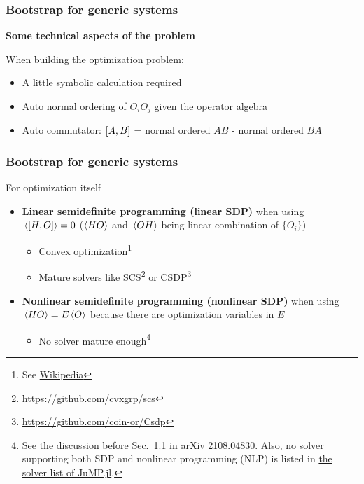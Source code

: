 \documentclass{beamer}
\newcommand{\concept}[1]{\textbf{#1}}
\begin{document}
\begin{frame}
\frametitle{Bootstrap for generic systems}

\textbf{Some technical aspects of the problem}

When building the optimization problem: 
\begin{itemize}
    \item A little symbolic calculation required
    \item Auto normal ordering of $O_i O_j$ given the operator algebra
    \item Auto commutator: $\comm{A}{B}$ = normal ordered $AB$ - normal ordered $BA$ 
\end{itemize}

\end{frame}

\begin{frame}
\frametitle{Bootstrap for generic systems}

For optimization itself
\begin{itemize}
    \item \concept{Linear semidefinite programming (linear SDP)} when using $\expval*{\comm{H}{O}} = 0$
    ($\expval{HO}$ and $\expval*{OH}$ being linear combination of $\{O_i\}$)
    \begin{itemize}
        \item Convex optimization\footnote{See \href{https://en.wikipedia.org/wiki/Semidefinite_programming}{Wikipedia}} 
        \item Mature solvers like SCS\footnote{\href{https://github.com/cvxgrp/scs}{https://github.com/cvxgrp/scs}} or CSDP\footnote{\href{https://github.com/coin-or/Csdp}{https://github.com/coin-or/Csdp}}
    \end{itemize}
    \item \concept{Nonlinear semidefinite programming (nonlinear SDP)} when using $\expval*{{H}{O}} = E \expval*{O}$
    because there are optimization variables in $E$
    \begin{itemize}
        \item No solver mature enough\footnote{See the discussion before Sec.~1.1 in \href{https://arxiv.org/abs/2108.04830}{arXiv 2108.04830}. Also, no solver supporting both SDP and nonlinear programming (NLP) is listed in \href{https://jump.dev/JuMP.jl/stable/installation/}{the solver list of JuMP.jl}.}
    \end{itemize}
\end{itemize}    

\end{frame}
\end{document}
